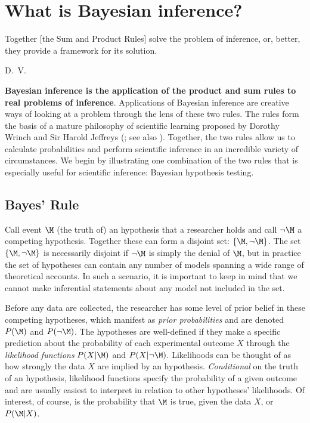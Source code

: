 \section{What is Bayesian inference?}
\epigraph{Together [the Sum and Product Rules] solve the problem of inference, or, better, they provide a framework for its solution.}{D.~V.~}

\textbf{Bayesian inference is the application of the product and sum rules to real problems of inference}. Applications of Bayesian inference are creative ways of looking at a problem through the lens of these two rules. The rules form the basis of a mature philosophy of scientific learning {proposed} by Dorothy Wrinch and Sir Harold Jeffreys  (; see also ). Together, the two rules allow us to calculate probabilities and perform scientific inference in an incredible variety of circumstances. We begin by illustrating one combination of the two rules that is especially useful for scientific inference: Bayesian hypothesis testing.

\subsection{Bayes' Rule}

Call event $\M$ (the truth of) an hypothesis that a researcher holds and call $\neg{\M}$ a competing hypothesis. 
Together these {can} form a disjoint set: $\{\M,\neg{\M}\}$. {The set $\{\M,\neg{\M}\}$ is necessarily disjoint if $\neg{\M}$ is simply the denial of $\M$, but in practice the set of hypotheses can contain any number of models spanning a wide range of theoretical accounts. In such a scenario, it is important to keep in mind that we cannot make inferential statements about any model not included in the set.} 

Before any data are collected, the researcher has some level of prior belief in these competing hypotheses, which manifest as \textit{prior probabilities} and are denoted $P(\M)$ and $P(\neg{\M})$. The hypotheses are well-defined if they make a specific prediction about the probability of each experimental outcome $X$ through the \emph{likelihood functions} $P(X|\M)$ and $P(X|\neg\M)$. Likelihoods can be thought of as how strongly the data $X$ are implied by an hypothesis. \textit{Conditional} on the truth of an hypothesis, likelihood functions specify the probability of a given outcome and are usually easiest to interpret in relation to other hypotheses' likelihoods. Of interest, of course, is the probability that $\M$ is true, given the data $X$, or $P(\M|X)$. 

